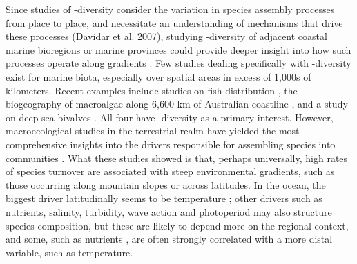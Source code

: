 \documentclass[utf8]{frontiersSCNS} %
\begin{document}
Since studies of \textbeta-diversity consider the variation in species assembly processes from place to place, and necessitate an understanding of mechanisms that drive these processes (Davidar et al. 2007), studying \textbeta-diversity of adjacent coastal marine bioregions or marine provinces \citep{Spalding2007} could provide deeper insight into how such processes operate along gradients \citep{Qian2007}. Few studies dealing specifically with \textbeta-diversity exist for marine biota, especially over spatial areas in excess of 1,000s of kilometers. Recent examples include studies on fish distribution \citep{Zintzen2010,Anderson2013}, the biogeography of macroalgae along 6,600 km of Australian coastline \citep{Leaper2011}, and a study on deep-sea bivalves \citep{McClain2011}. All four have \textbeta-diversity as a primary interest. However, macroecological studies in the terrestrial realm have yielded the most comprehensive insights into the drivers responsible for assembling species into communities \citep{Whittaker1960,Davidar2007,Qian2007,Soininen2007a}. What these studies showed is that, perhaps universally, high rates of species turnover are associated with steep environmental gradients, such as those occurring along mountain slopes or across latitudes. In the ocean, the biggest driver latitudinally seems to be temperature \citep{Tittensor2010,StuartSmith2017b}; other drivers such as nutrients, salinity, turbidity, wave action and photoperiod may also structure species composition, but these are likely to depend more on the regional context, and some, such as nutrients \citep[\emph{e.g.}][]{Waldron1992}, are often strongly correlated with a more distal variable, such as temperature.
\end{document}
